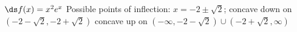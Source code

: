 {$\ds f(x) = x^2e^x$
}
{Possible points of inflection: $x=-2\pm\sqrt{2}$;
concave down on $(-2-\sqrt{2},-2+\sqrt{2})$
concave up on $(-\infty,-2-\sqrt{2}) \cup (-2+\sqrt{2},\infty)$
}
